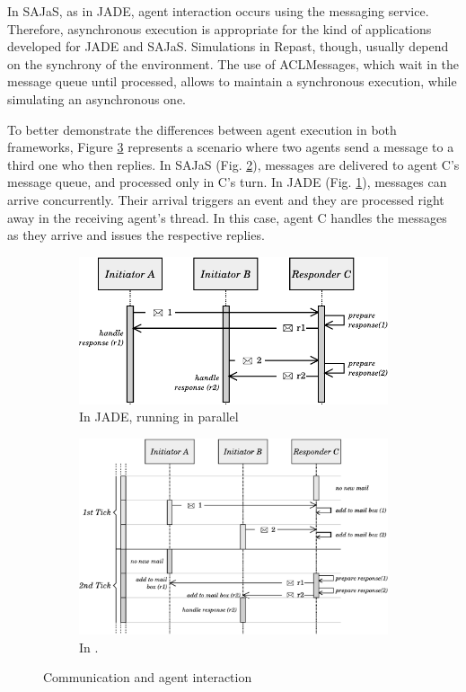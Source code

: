 In SAJaS, as in JADE, agent interaction occurs using the messaging service. Therefore, asynchronous execution is appropriate for the kind of applications developed for JADE and SAJaS. Simulations in Repast, though, usually depend on the synchrony of the environment. The use of ACLMessages, which wait in the message queue until processed, allows to maintain a synchronous execution, while simulating an asynchronous one.

To better demonstrate the differences between agent execution in both frameworks, Figure \ref{fig:execution_example} represents a scenario where two agents send a message to a third one who then replies. In SAJaS (Fig. \ref{fig:com-example-repast}), messages are delivered to agent C's message queue, and processed only in C's turn. In JADE (Fig. \ref{fig:com-example-jade}), messages can arrive concurrently. Their arrival triggers an event and they are processed right away in the receiving agent's thread. In this case, agent C handles the messages as they arrive and issues the respective replies.

\begin{figure}
	\centering
    \begin{subfigure}[b]{\linewidth}
		\centering
		\includegraphics[width=0.7\linewidth]{figures/tickExample2.pdf}
		\caption{
			In JADE, running in parallel
		}
		\label{fig:com-example-jade}
    \end{subfigure}
    \vspace{1cm}
    \begin{subfigure}[b]{\linewidth}
		\centering
		\includegraphics[width=0.9\linewidth]{figures/tickExample.pdf}
		\caption{
			In \apiname{}.
		}
		\label{fig:com-example-repast}
    \end{subfigure}
    \caption{Communication and agent interaction}
    \label{fig:execution_example}
\end{figure}


